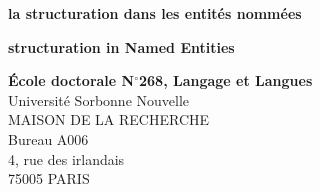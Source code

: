 \documentclass[12pt,a4paper,times,twoside,openright]{report}
\begin{document}



%
%

\cleardoublepage
\clearpage\value{page}\null\pagestyle{empty}\newpage

\pagestyle{empty}
\linespread{1.0}

\begin{center}\textbf{la structuration dans les entités nommées}\end{center}
\small{  }

\vspace{0.2em}

\begin{center}\textbf{structuration in Named Entities}\end{center}
\small{  }

\vspace{0.25em}

\begin{flushleft}
\textbf{École doctorale N$^{\circ}$268, Langage et Langues}\\
Université Sorbonne Nouvelle \\
MAISON DE LA RECHERCHE \\
Bureau A006 \\
4, rue des irlandais \\
75005 PARIS
\end{flushleft}
\end{document}
